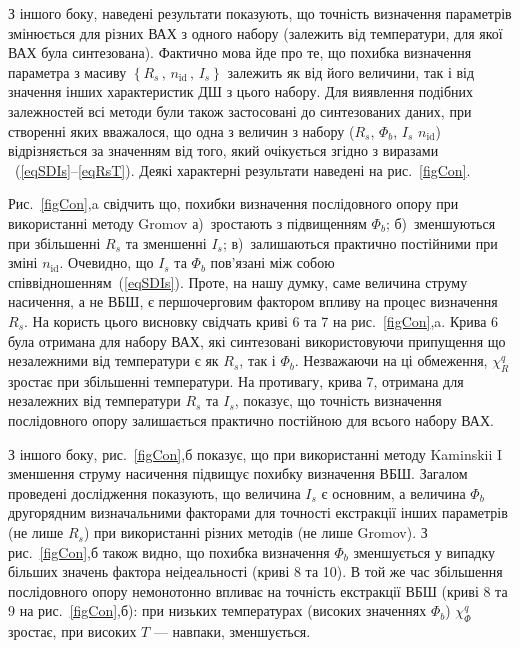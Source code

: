 З іншого боку, наведені результати показують, що точність визначення параметрів змінюється для різних ВАХ з одного набору (залежить від температури, для якої ВАХ була синтезована).
Фактично мова йде про те, що похибка визначення параметра з масиву $\left\{R_s\,,\,n_\mathrm{id}\,,\, I_s\right\}$ залежить як від його величини, так і від значення інших характеристик ДШ з цього набору.
Для виявлення подібних залежностей всі методи були також застосовані до синтезованих даних, при створенні яких вважалося, що одна з величин з набору ($R_s$, $\Phi_b$, $I_s$ $n_\mathrm{id}$) відрізняється за значенням від того, який очікується згідно з виразами ~(\ref{eqSDIs}--\ref{eqRsT}).
Деякі характерні результати наведені на рис.~\ref{figCon}.

Рис.~\ref{figCon},a свідчить що, похибки визначення послідовного опору при використанні методу Gromov
а)~зростають з підвищенням $\Phi_b$;
б)~зменшуються при збільшенні $R_s$ та зменшенні $I_s$;
в)~залишаються практично постійними при зміні $n_\mathrm{id}$.
Очевидно, що $I_s$ та $\Phi_b$ пов'язані між собою співвідношенням~(\ref{eqSDIs}).
Проте, на нашу думку, саме величина струму насичення, а не ВБШ, є першочерговим фактором впливу на процес визначення $R_s$.
На користь цього висновку свідчать криві 6 та 7 на рис.~\ref{figCon},a.
Крива 6 була отримана для набору ВАХ, які синтезовані використовуючи припущення що незалежними від температури є як $R_s$, так і $\Phi_b$.
Незважаючи на ці обмеження, $\chi^q_R$ зростає при збільшенні температури.
На противагу, крива 7, отримана для незалежних від температури $R_s$ та $I_s$, показує, що точність визначення послідовного опору залишається практично постійною для всього набору ВАХ.

З іншого боку, рис.~\ref{figCon},б показує, що при використанні методу Kaminskii I зменшення струму насичення підвищує похибку визначення ВБШ.
Загалом проведені дослідження показують, що величина $I_s$ є основним, а величина  $\Phi_b$ другорядним визначальними факторами для точності екстракції інших параметрів (не лише $R_s$) при використанні різних методів (не лише Gromov).
З рис.~\ref{figCon},б також видно, що похибка визначення $\Phi_b$ зменшується у випадку більших значень фактора неідеальності (криві 8 та 10).
В той же час збільшення послідовного опору немонотонно впливає на точність екстракції ВБШ (криві 8 та 9 на рис.~\ref{figCon},б):
при низьких температурах (високих значеннях $\Phi_b$) $\chi^q_{\Phi}$ зростає, при високих $T$ --- навпаки, зменшується.

